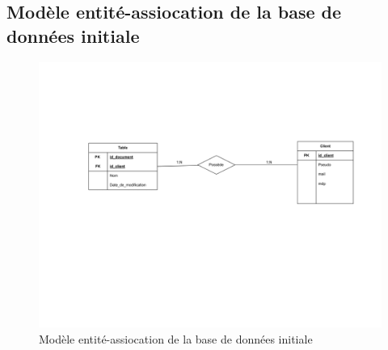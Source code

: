 	\newpage
	
	\subsection{Modèle entité-assiocation de la base de données initiale}
	
	\begin{figure}[hb]
	\centering
	\includegraphics[scale=.5]{setup/modele_entite_association.png}
	
	\caption{Modèle entité-assiocation de la base de données initiale}
	\end{figure}
		
